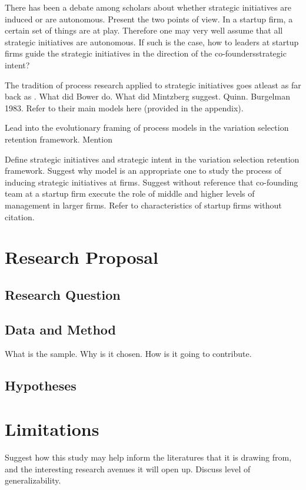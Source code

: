 \documentclass[12pt,letterpaper]{article}
\begin{document}
There has been a debate among scholars about whether strategic initiatives are induced or are autonomous. Present the two points of view. In a startup firm, a certain set of things are at play. Therefore one may very well assume that all strategic initiatives are autonomous. If such is the case, how to leaders at startup firms guide the strategic initiatives in the direction of the co-founders\textquotesingle strategic intent?

The tradition of process research applied to strategic initiatives goes atleast as far back as \cite{Bower1970}. What did Bower do. What did Mintzberg suggest. Quinn. Burgelman 1983. Refer to their main models here (provided in the appendix).

Lead into the evolutionary framing of process models in the variation selection retention framework. Mention \cite{Burgelman1991, Burgelman1994, Noda1996, Lovas2000}

Define strategic initiatives and strategic intent in the variation selection retention framework. Suggest why \cite{Lovas2000} model is an appropriate one to study the process of inducing strategic initiatives at firms. Suggest without reference that co-founding team at a startup firm execute the role of middle and higher levels of management in larger firms. Refer to characteristics of startup firms without citation.

\section{Research Proposal}
\subsection{Research Question}

\subsection{Data and Method}
What is the sample. Why is it chosen. How is it going to contribute.

\subsection{Hypotheses}

\section{Limitations}
Suggest how this study may help inform the literatures that it is drawing from, and the interesting research avenues it will open up. Discuss level of generalizability.
\end{document}
